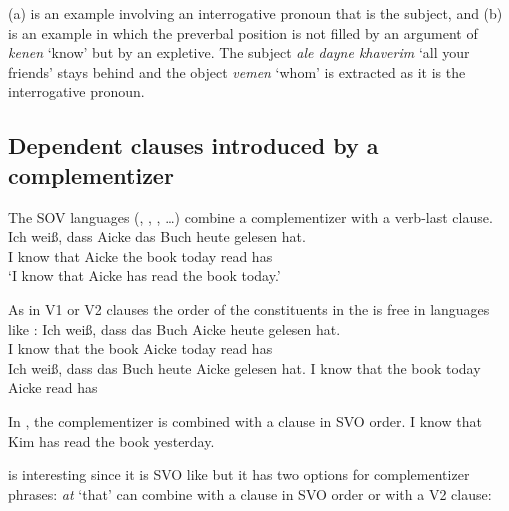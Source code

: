 \eal
\label{ex-Yiddish-interrogatives-expletive}
\zl
\largerpage
(a) is an example involving an interrogative pronoun that is the subject, and (b) is an
example in which the preverbal position is not filled by an argument of \emph{kenen} `know' but by
an expletive. The subject \emph{ale dayne khaverim} `all your friends' stays behind and the object
\emph{vemen} `whom' is extracted as it is the interrogative pronoun.


\subsection{Dependent clauses introduced by a complementizer}


The SOV languages (, , , \ldots) combine a complementizer with a verb-last clause.
\ea
\gll Ich weiß, dass Aicke das Buch heute gelesen hat.\\
     I   know  that Aicke the book today read    has\\
\glt `I know that Aicke has read the book today.'
\z

As in V1 or V2 clauses the order of the constituents in the \mf is free in languages like :
\eal
\ex 
\gll Ich weiß, dass das Buch Aicke heute gelesen hat.\\
     I   know  that the book Aicke today read has\\
\ex 
\gll Ich weiß, dass das Buch heute Aicke gelesen hat.
     I   know  that the book today Aicke read has\\
\zl

In , the complementizer is combined with a clause in SVO order.
\ea
I  know that Kim has read the book yesterday.
\z


 is interesting since it is SVO like  but it has two options for complementizer
phrases: \emph{at} `that' can combine with a clause in SVO order or with a V2 clause:
\z

